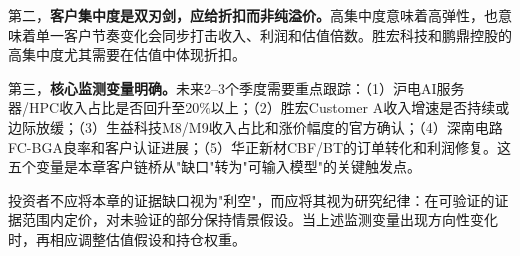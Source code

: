 第二，\textbf{客户集中度是双刃剑，应给折扣而非纯溢价。}高集中度意味着高弹性，也意味着单一客户节奏变化会同步打击收入、利润和估值倍数。胜宏科技和鹏鼎控股的高集中度尤其需要在估值中体现折扣。

第三，\textbf{核心监测变量明确。}未来2--3个季度需要重点跟踪：（1）沪电AI服务器/HPC收入占比是否回升至20\%以上；（2）胜宏Customer A收入增速是否持续或边际放缓；（3）生益科技M8/M9收入占比和涨价幅度的官方确认；（4）深南电路FC-BGA良率和客户认证进展；（5）华正新材CBF/BT的订单转化和利润修复。这五个变量是本章客户链桥从"缺口"转为"可输入模型"的关键触发点。

投资者不应将本章的证据缺口视为"利空"，而应将其视为研究纪律：在可验证的证据范围内定价，对未验证的部分保持情景假设。当上述监测变量出现方向性变化时，再相应调整估值假设和持仓权重。
